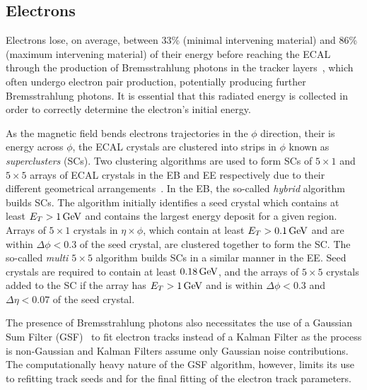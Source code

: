 \subsection{Electrons}\label{subsec:objReco-electrons}
Electrons lose, on average, between 33\% (minimal intervening material) and 86\% (maximum intervening material) of their energy before reaching the ECAL through the production of Bremsstrahlung photons in the tracker layers~\cite{Khachatryan:2015hwa}, which often undergo electron pair production, potentially producing further Bremsstrahlung photons.	
It is essential that this radiated energy is collected in order to correctly determine the electron's initial energy.

As the magnetic field bends electrons trajectories in the $\phi$ direction, their is energy across $\phi$, the ECAL crystals are clustered into strips in $\phi$ known as \emph{superclusters} (SCs).
Two clustering algorithms are used to form SCs of $5 \times 1$ and $5 \times 5$ arrays of ECAL crystals in the EB and EE respectively due to their different geometrical arrangements~\cite{Khachatryan:2015hwa}.
In the EB, the so-called \emph{hybrid} algorithm builds SCs.
The algorithm initially identifies a seed crystal which contains at least $E_{T} > 1\,\text{Ge\hspace{-.08em}V}$ and contains the largest energy deposit for a given region.
Arrays of $5 \times 1$ crystals in $\eta \times \phi$, which contain at least $E_{T} > 0.1\,\text{Ge\hspace{-.08em}V}$ and are within $\Delta \phi < 0.3$ of the seed crystal, are clustered together to form the SC.
The so-called \emph{multi $5 \times 5$} algorithm builds SCs in a similar manner in the EE.
Seed crystals are required to contain at least $0.18\,\text{Ge\hspace{-.08em}V}$, and the arrays of $5 \times 5$ crystals added to the SC if the array has $E_{T} > 1\,\text{Ge\hspace{-.08em}V}$ and is within $\Delta \phi < 0.3$ and $\Delta \eta < 0.07$ of the seed crystal.

The presence of Bremsstrahlung photons also necessitates the use of a Gaussian Sum Filter (GSF)~\cite{Adam:2003eca} to fit electron tracks instead of a Kalman Filter as the process is non-Gaussian and Kalman Filters assume only Gaussian noise contributions.
The computationally heavy nature of the GSF algorithm, however, limits its use to refitting \KF track seeds and for the final fitting of the electron track parameters.


